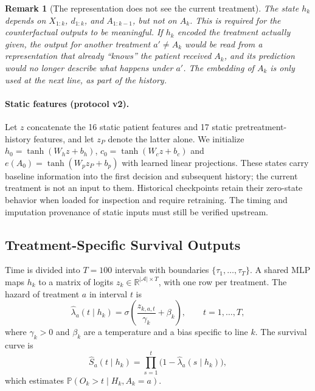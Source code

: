 \documentclass[a4paper,10pt]{article}
\newtheorem{remark}{Remark}
\begin{document}
\begin{remark}[The representation does not see the current treatment]
The state $h_k$ depends on $X_{1:k}$, $d_{1:k}$, and $A_{1:k-1}$, but not on $A_k$. This is required for the counterfactual outputs to be meaningful. If $h_k$ encoded the treatment actually given, the output for another treatment $a' \neq A_k$ would be read from a representation that already ``knows'' the patient received $A_k$, and its prediction would no longer describe what happens under $a'$. The embedding of $A_k$ is only used at the next line, as part of the history.
\end{remark}

\paragraph{Static features (protocol v2).} Let $z$ concatenate the 16 static patient features and 17 static pretreatment-history features, and let $z_P$ denote the latter alone. We initialize $h_0=\tanh(W_hz+b_h)$, $c_0=\tanh(W_cz+b_c)$ and $e(A_0)=\tanh(W_pz_P+b_p)$ with learned linear projections. These states carry baseline information into the first decision and subsequent history; the current treatment is not an input to them. Historical checkpoints retain their zero-state behavior when loaded for inspection and require retraining. The timing and imputation provenance of static inputs must still be verified upstream.

\subsection{Treatment-Specific Survival Outputs}
\label{sec:survival-heads}

Time is divided into $T = 100$ intervals with boundaries $\{\tau_1, \ldots, \tau_T\}$. A shared MLP maps $h_k$ to a matrix of logits $z_k \in \mathbb{R}^{|\mathcal{A}| \times T}$, with one row per treatment. The hazard of treatment $a$ in interval $t$ is
\begin{equation}
    \hat{\lambda}_a(t \mid h_k) = \sigma\!\left( \frac{z_{k,a,t}}{\gamma_k} + \beta_k \right), \qquad t = 1, \ldots, T,
\end{equation}
where $\gamma_k > 0$ and $\beta_k$ are a temperature and a bias specific to line $k$. The survival curve is
\begin{equation}
    \hat{S}_a(t \mid h_k) = \prod_{s=1}^{t} \big( 1 - \hat{\lambda}_a(s \mid h_k) \big),
\end{equation}
which estimates $\mathbb{P}(O_k > t \mid H_k, A_k = a)$.
\end{document}
